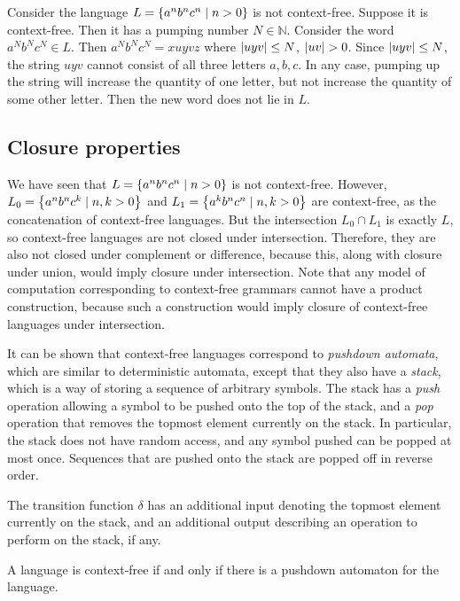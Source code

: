 \begin{example}
	Consider the language \( L = \qty{a^n b^n c^n \mid n > 0} \) is not context-free.
	Suppose it is context-free.
	Then it has a pumping number \( N \in \mathbb N \).
	Consider the word \( a^N b^N c^N \in L \).
	Then \( a^N b^N c^N = xuyvz \) where \( \abs{uyv} \leq N \), \( \abs{uv} > 0 \).
	Since \( \abs{uyv} \leq N \), the string \( uyv \) cannot consist of all three letters \( a, b, c \).
	In any case, pumping up the string will increase the quantity of one letter, but not increase the quantity of some other letter.
	Then the new word does not lie in \( L \).
\end{example}

\subsection{Closure properties}
We have seen that \( L = \qty{a^nb^nc^n \mid n > 0} \) is not context-free.
However, \( L_0 = \qty{a^nb^nc^k \mid n, k > 0} \) and \( L_1 = \qty{a^kb^nc^n \mid n, k > 0} \) are context-free, as the concatenation of context-free languages.
But the intersection \( L_0 \cap L_1 \) is exactly \( L \), so context-free languages are not closed under intersection.
Therefore, they are also not closed under complement or difference, because this, along with closure under union, would imply closure under intersection.
Note that any model of computation corresponding to context-free grammars cannot have a product construction, because such a construction would imply closure of context-free languages under intersection.

It can be shown that context-free languages correspond to \emph{pushdown automata}, which are similar to deterministic automata, except that they also have a \emph{stack}, which is a way of storing a sequence of arbitrary symbols.
The stack has a \emph{push} operation allowing a symbol to be pushed onto the top of the stack, and a \emph{pop} operation that removes the topmost element currently on the stack.
In particular, the stack does not have random access, and any symbol pushed can be popped at most once.
Sequences that are pushed onto the stack are popped off in reverse order.

The transition function \( \delta \) has an additional input denoting the topmost element currently on the stack, and an additional output describing an operation to perform on the stack, if any.
\begin{theorem}
	A language is context-free if and only if there is a pushdown automaton for the language.
\end{theorem}

